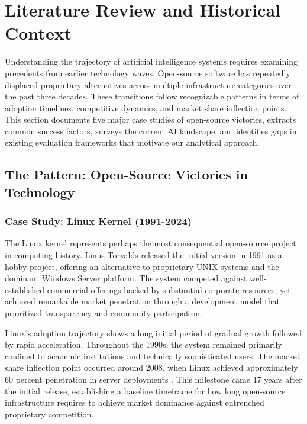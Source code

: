 
\section{Literature Review and Historical Context}

Understanding the trajectory of artificial intelligence systems requires examining precedents from earlier technology waves. Open-source software has repeatedly displaced proprietary alternatives across multiple infrastructure categories over the past three decades. These transitions follow recognizable patterns in terms of adoption timelines, competitive dynamics, and market share inflection points. This section documents five major case studies of open-source victories, extracts common success factors, surveys the current AI landscape, and identifies gaps in existing evaluation frameworks that motivate our analytical approach.

\subsection{The Pattern: Open-Source Victories in Technology}

\subsubsection{Case Study: Linux Kernel (1991-2024)}

The Linux kernel represents perhaps the most consequential open-source project in computing history. Linus Torvalds released the initial version in 1991 as a hobby project, offering an alternative to proprietary UNIX systems and the dominant Windows Server platform. The system competed against well-established commercial offerings backed by substantial corporate resources, yet achieved remarkable market penetration through a development model that prioritized transparency and community participation.

Linux's adoption trajectory shows a long initial period of gradual growth followed by rapid acceleration. Throughout the 1990s, the system remained primarily confined to academic institutions and technically sophisticated users. The market share inflection point occurred around 2008, when Linux achieved approximately 60 percent penetration in server deployments \cite{linux_truelist2024}. This milestone came 17 years after the initial release, establishing a baseline timeframe for how long open-source infrastructure requires to achieve market dominance against entrenched proprietary competition.

